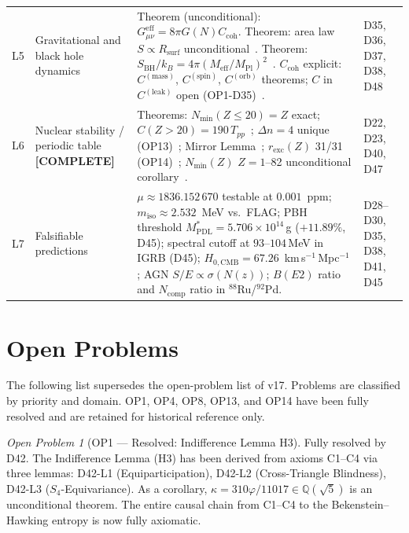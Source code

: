 \documentclass[11pt,a4paper]{article}
\theoremstyle{plain}
\theoremstyle{definition}
\theoremstyle{remark}
\newtheorem{openproblem}[theorem]{Open Problem}
\newcommand{\Rsurf}{R_{\mathrm{surf}}}
\newcommand{\SBH}{S_{\mathrm{BH}}}
\newcommand{\Meff}{M_{\mathrm{eff}}}
\newcommand{\MPl}{M_{\mathrm{Pl}}}
\newcommand{\Tpp}{T_{pp}}
\newcommand{\Ccoh}{C_{\mathrm{coh}}}
\begin{document}
\begin{longtable}{L{0.6cm}L{3.0cm}L{5.5cm}L{4.0cm}}
L5 & Gravitational and black hole dynamics & \textcolor{proofblue}{Theorem} (unconditional): $G_{\mu\nu}^{\mathrm{eff}}=8\pi G(N)\Ccoh$. \textcolor{proofblue}{Theorem}: area law $S\propto\Rsurf$ unconditional~\cite{D37}. \textcolor{proofblue}{Theorem}: $\SBH/k_B=4\pi(\Meff/\MPl)^2$~\cite{D38}. $\Ccoh$ explicit: $C^{(\mathrm{mass})}$, $C^{(\mathrm{spin})}$, $C^{(\mathrm{orb})}$ theorems; $C$ in $C^{(\mathrm{leak})}$ open (OP1-D35)~\cite{D48}. & D35, D36, D37, D38, D48\\[0.4em]
L6 & Nuclear stability / periodic table \textbf{[COMPLETE]} & \textcolor{proofblue}{Theorems}: $N_{\min}(Z\leq20)=Z$ exact; $C(Z>20)=190\,\Tpp$~\cite{D40}; $\Delta n=4$ unique (OP13)~\cite{D47}; Mirror Lemma~\cite{D47}; $r_{\mathrm{exc}}(Z)$ 31/31 (OP14)~\cite{D47}; $N_{\min}(Z)$ $Z=1$--82 unconditional corollary~\cite{D47}. & D22, D23, D40, D47\\[0.4em]
L7 & Falsifiable predictions & $\mu\approx 1836.152\,670$ testable at $0.001$~ppm; $m_{\mathrm{iso}}\approx 2.532$~MeV vs.\ FLAG; PBH threshold $M^*_{\mathrm{PDL}}=5.706\times10^{14}$\,g ($+11.89\%$, D45); spectral cutoff at $93$--$104$\,MeV in IGRB (D45); $H_{0,\mathrm{CMB}}=67.26$~km\,s$^{-1}$\,Mpc$^{-1}$; AGN $S/E \propto \sigma(N(z))$; $B(E2)$ ratio and $N_{\mathrm{comp}}$ ratio in $^{88}$Ru/$^{92}$Pd. & D28--D30, D35, D38, D41, D45\\[0.3em]
\end{longtable}

\section{Open Problems}
\label{sec:openproblems}

The following list supersedes the open-problem list of v17. Problems are classified by priority and domain. OP1, OP4, OP8, OP13, and OP14 have been fully resolved and are retained for historical reference only.

\begin{openproblem}[OP1 --- Resolved: Indifference Lemma H3]
\label{op:H3}
\textcolor{proofblue}{Fully resolved by D42.} The Indifference Lemma (H3) has been derived from axioms C1--C4 via three lemmas: D42-L1 (Equiparticipation), D42-L2 (Cross-Triangle Blindness), D42-L3 ($S_4$-Equivariance). As a corollary, $\kappa=310\varphi/11017\in\mathbb{Q}(\sqrt{5})$ is an unconditional theorem. The entire causal chain from C1--C4 to the Bekenstein--Hawking entropy is now fully axiomatic.
\end{openproblem}
\end{document}
